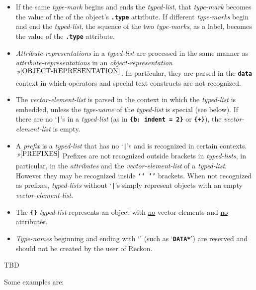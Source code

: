 \documentclass[12pt]{article}
\newcommand{\TT}[1]{{\tt \bfseries #1}}
\newcommand{\pagnote}[1]{$\,^{p\pageref{#1}}$}
\newenvironment{indpar}[1][0.3in]%
	{\begin{list}{}%
		     {\setlength{\itemsep}{0in}%
		      \setlength{\topsep}{0in}%
		      \setlength{\parsep}{1ex}%
		      \setlength{\labelwidth}{#1}%
		      \setlength{\leftmargin}{#1}%
		      \addtolength{\leftmargin}{\labelsep}}%
	 \item}%
	{\end{list}}
\begin{document}
\begin{indpar}[0.2in]
\begin{itemize}
\item If the same {\em type-mark} begins and ends the
{\em typed-list}, that {\em type-mark} becomes the value of the
of the object's \TT{.type} attribute.
If different {\em type-marks}
begin and end the {\em typed-list}, the squence of the two
{\em type-marks}, as a label, becomes the value of the \TT{.type}
attribute.

\item {\em Attribute-representations} in a {\em typed-list} are processed
in the same manner as {\em attribute-representations} in an
{\em object-representation}\pagnote{OBJECT-REPRESENTATION}.
In particular, they are parsed in the \TT{data} context in which
operators and special text constructs are not recognized.

\item The {\em vector-element-list}
is parsed in the context in which the {\em typed-list} is embedded,
unless the {\em type-name} of the {\em typed-list} is special (see
below).  If there are no `\TT{|}'s  in a {\em typed-list} (as in
\TT{\{b: indent = 2\}} or \TT{\{+\}}), the
{\em vector-element-list} is empty.

\item A {\em prefix} is a {\em typed-list} that has
no `\TT{|}'s and is recognized in certain contexts.\pagnote{PREFIXES}
Prefixes are not recognized outside brackets in {\em typed-lists},
in particular, in the
{\em attributes} and the {\em vector-element-list} of a {\em typed-list}.
However they may be recognized inside \TT{`{}`~'{}'} brackets.
When not recognized as prefixes, {\em typed-lists} without `\TT{|}'s
simply represent objects
with an empty {\em vector-element-list}.

\item The \TT{\{\}} {\em typed-list} represents an object with
\underline{no} vector elements and \underline{no} attributes.

\item {\em Type-names} beginning and ending with `\TT{*}'
(such as `\TT{*DATA*}') are reserved and should not be created by the
user of Reckon.

\end{itemize}
\end{indpar}

TBD


Some examples are:
\end{document}
